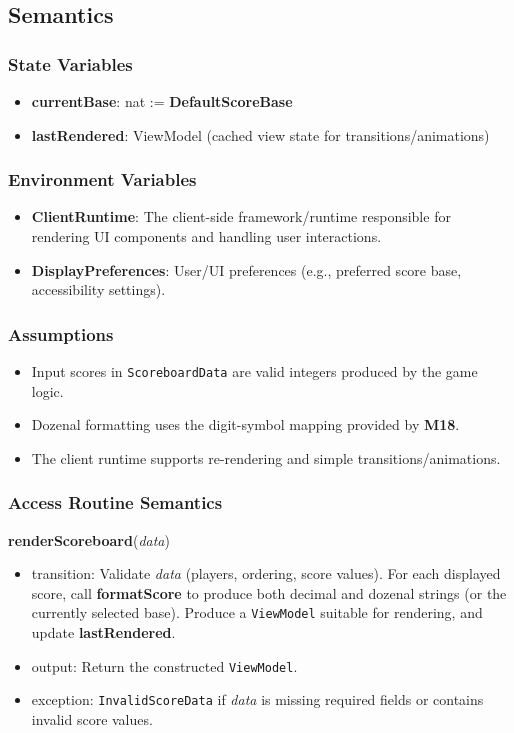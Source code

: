 \documentclass[12pt, titlepage]{article}
\begin{document}
\subsection{Semantics}

\subsubsection{State Variables}
\begin{itemize}
    \item \textbf{currentBase}: nat := \textbf{DefaultScoreBase}
    \item \textbf{lastRendered}: ViewModel \quad (cached view state for transitions/animations)
\end{itemize}

\subsubsection{Environment Variables}
\begin{itemize}
    \item \textbf{ClientRuntime}: The client-side framework/runtime responsible for rendering UI components and handling user interactions.
    \item \textbf{DisplayPreferences}: User/UI preferences (e.g., preferred score base, accessibility settings).
\end{itemize}

\subsubsection{Assumptions}
\begin{itemize}
    \item Input scores in \texttt{ScoreboardData} are valid integers produced by the game logic.
    \item Dozenal formatting uses the digit-symbol mapping provided by \textbf{M18}.
    \item The client runtime supports re-rendering and simple transitions/animations.
\end{itemize}

\subsubsection{Access Routine Semantics}

\noindent\textbf{renderScoreboard}(\textit{data})
\begin{itemize}
    \item transition: Validate \textit{data} (players, ordering, score values). For each displayed score, call \textbf{formatScore} to produce both decimal and dozenal strings (or the currently selected base). Produce a \texttt{ViewModel} suitable for rendering, and update \textbf{lastRendered}.
    \item output: Return the constructed \texttt{ViewModel}.
    \item exception: \texttt{InvalidScoreData} if \textit{data} is missing required fields or contains invalid score values.
\end{itemize}
\end{document}
